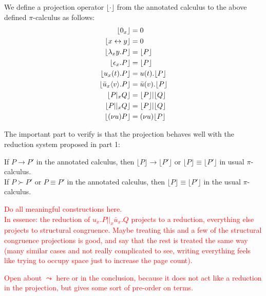 \begin{definition}
We define a projection operator $\lfloor\cdot\rfloor$ from the annotated calculus to the above defined $\pi$-calculus as follows:\\
\begin{align*}
\lfloor 0_x \rfloor &= 0 \\
\lfloor x \leftrightarrow y \rfloor &= 0 \\
\lfloor \lambda_xy.P \rfloor &= \lfloor P \rfloor \\
\lfloor \epsilon_x.P \rfloor &= \lfloor P \rfloor \\
\lfloor u_x(t).P \rfloor &= u(t).\lfloor P \rfloor \\
\lfloor \bar{u}_x\langle v\rangle.P \rfloor &= \bar{u}(v).\lfloor P \rfloor \\
\lfloor P |_x Q \rfloor &= \lfloor P \rfloor | \lfloor Q \rfloor \\
\lfloor P ||_x Q \rfloor &= \lfloor P \rfloor | \lfloor Q \rfloor \\
\lfloor (\nu u)P \rfloor &= (\nu u)\lfloor P \rfloor
\end{align*}
\end{definition}

The important part to verify is that the projection behaves well with the reduction system proposed in part 1:

\begin{proposition}
If $P \to P'$ in the annotated calculus, then $\lfloor P \rfloor \to \lfloor P' \rfloor$ or $\lfloor P \rfloor \equiv \lfloor P' \rfloor$ in usual $\pi$-calculus.\\
If $P \succ P'$ or $P \equiv P'$ in the annotated calculus, then $\lfloor P \rfloor \equiv \lfloor P' \rfloor$ in the usual $\pi$-calculus.
\end{proposition}

\begin{myproof}
\textcolor{red}{Do all meaningful constructions here.\\
In essence: the reduction of $u_x.P||_x\bar{u}_x.Q$ projects to a reduction, everything else projects to structural congruence. Maybe treating this and a few of the structural congruence projections is good, and say that the rest is treated the same way (many similar cases and not really complicated to see, writing everything feels like trying to occupy space just to increase the page count).} %
\end{myproof}

\textcolor{red}{Open about $\leadsto$ here or in the conclusion, because it does not act like a reduction in the projection, but gives some sort of pre-order on terms.} %